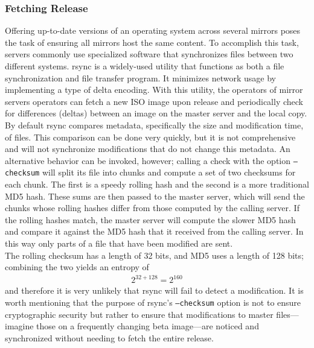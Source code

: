 \documentclass[conference]{IEEEtran}
\begin{document}
\subsubsection{Fetching Release}
Offering up-to-date versions of an operating system across several
mirrors poses the task of ensuring all mirrors host the same content.
To accomplish this task, servers commonly use specialized software that
synchronizes files between two different systems.
rsync is a widely-used utility that functions as both a file synchronization
and file transfer program. It minimizes network usage by implementing a
type of delta encoding. With this utility, the operators of mirror
servers operators can fetch a new ISO image upon release and periodically
check for differences (deltas) between an image on the master server and
the local copy.\\
\indent By default rsync compares metadata, specifically the size and modification time, of files. This comparison can be done very quickly,
but it is not comprehensive and will not synchronize modifications that
do not change this metadata. An alternative behavior can be invoked,
however; calling a check with the option \texttt{--checksum} will split
its file into chunks and compute a set of two checksums for each chunk.
The first is a speedy rolling hash and the second is a more traditional
MD5 hash. These sums are then passed to the master server,
which will send the chunks whose rolling hashes differ from
those computed by the calling server. If the rolling hashes match,
the master server will compute the slower MD5 hash and compare it against
the MD5 hash that it received from the calling server. In this way
only parts of a file that have been modified are sent.\\
\indent The rolling checksum has a length of 32 bits, and MD5 uses a
length of 128 bits; combining the two yields an entropy of
\begin{align*}
2^{32+128}=2^{160}
\end{align*}
and therefore it is very unlikely that rsync will fail to detect 
a modification. It is worth mentioning that the purpose of rsync's
\texttt{--checksum} option is not to ensure cryptographic security but
rather to ensure that modifications to master files---imagine those on a
frequently changing beta image---are noticed and synchronized without
needing to fetch the entire release.
\end{document}
